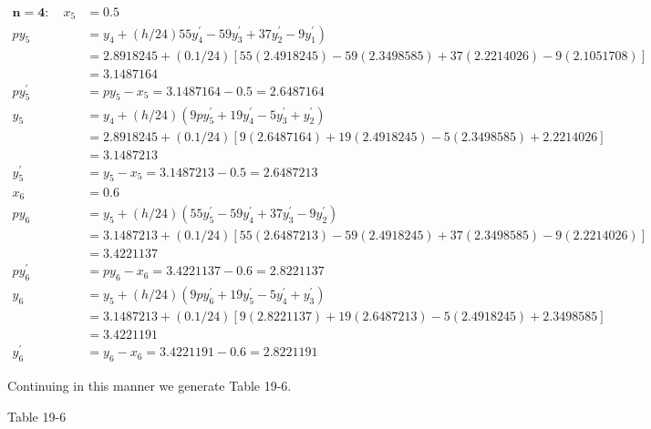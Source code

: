 \documentclass[10pt]{article}
\begin{document}
$$
\begin{aligned}
\mathbf{n = 4 :} \quad x_{5} & =0.5 \\
p y_{5} & \left.=y_{4}+(h / 24) 55 y_{4}^{\prime}-59 y_{3}^{\prime}+37 y_{2}^{\prime}-9 y_{1}^{\prime}\right) \\
& =2.8918245+(0.1 / 24)[55(2.4918245)-59(2.3498585)+37(2.2214026)-9(2.1051708)] \\
& =3.1487164 \\
p y_{5}^{\prime} & =p y_{5}-x_{5}=3.1487164-0.5=2.6487164 \\
y_{5} & =y_{4}+(h / 24)\left(9 p y_{5}^{\prime}+19 y_{4}^{\prime}-5 y_{3}^{\prime}+y_{2}^{\prime}\right) \\
& =2.8918245+(0.1 / 24)[9(2.6487164)+19(2.4918245)-5(2.3498585)+2.2214026] \\
& =3.1487213 \\
y_{5}^{\prime} & =y_{5}-x_{5}=3.1487213-0.5=2.6487213 \\
x_{6} & =0.6 \\
p y_{6} & =y_{5}+(h / 24)\left(55 y_{5}^{\prime}-59 y_{4}^{\prime}+37 y_{3}^{\prime}-9 y_{2}^{\prime}\right) \\
& =3.1487213+(0.1 / 24)[55(2.6487213)-59(2.4918245)+37(2.3498585)-9(2.2214026)] \\
& =3.4221137 \\
p y_{6}^{\prime} & =p y_{6}-x_{6}=3.4221137-0.6=2.8221137 \\
y_{6} & =y_{5}+(h / 24)\left(9 p y_{6}^{\prime}+19 y_{5}^{\prime}-5 y_{4}^{\prime}+y_{3}^{\prime}\right) \\
& =3.1487213+(0.1 / 24)[9(2.8221137)+19(2.6487213)-5(2.4918245)+2.3498585] \\
& =3.4221191 \\
y_{6}^{\prime} & =y_{6}-x_{6}=3.4221191-0.6=2.8221191
\end{aligned}
$$

Continuing in this manner we generate Table 19-6.

Table 19-6
\end{document}
